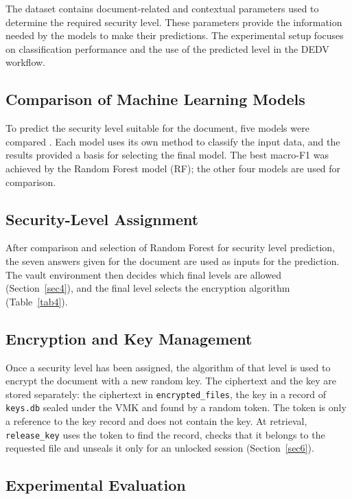 \documentclass[pdflatex,sn-mathphys-num]{sn-jnl}
\newcommand{\code}[1]{\texttt{#1}}
\begin{document}
The dataset contains document-related and contextual parameters used to determine the required
security level. These parameters provide the information needed by the models to make their
predictions. The experimental setup focuses on classification performance and the use of the
predicted level in the DEDV workflow.

\subsection{Comparison of Machine Learning Models}

To predict the security level suitable for the document, five models were compared
\cite{theng2024feature}. Each model uses its own method to classify the input data, and the
results provided a basis for selecting the final model. The best macro-F1 was achieved by the
Random Forest model (RF); the other four models are used for comparison.

\subsection{Security-Level Assignment}

After comparison and selection of Random Forest for security level prediction, the seven answers
given for the document are used as inputs for the prediction. The vault environment then decides
which final levels are allowed (Section~\ref{sec4}), and the final level selects the encryption
algorithm (Table~\ref{tab4}).

\subsection{Encryption and Key Management}

Once a security level has been assigned, the algorithm of that level is used to encrypt the
document with a new random key. The ciphertext and the key are stored separately: the ciphertext
in \code{encrypted\_files}, the key in a record of \code{keys.db} sealed under the VMK and found by
a random token. The token is only a reference to the key record and does not contain the key. At
retrieval, \code{release\_key} uses the token to find the record, checks that it belongs to the
requested file and unseals it only for an unlocked session (Section~\ref{sec6}).

\subsection{Experimental Evaluation}\label{sec7-5}
\end{document}
